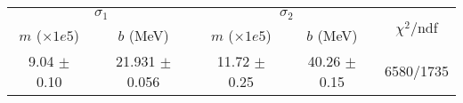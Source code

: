 \begin{tabular}{cc|cc||c}
\multicolumn{2}{c|}{$\sigma_1$} & \multicolumn{2}{|c}{$\sigma_2$} & \multirow{2}{*}{$\chi^2/$ndf} \\
$m$ ($\times1e5$) & $b$ (MeV) & $m$ ($\times1e5$) & $b$ (MeV) & \\
\hline
9.04 $\pm$ 0.10 & 21.931 $\pm$ 0.056 & 11.72 $\pm$ 0.25 & 40.26 $\pm$ 0.15 & 6580/1735\\
\end{tabular}
